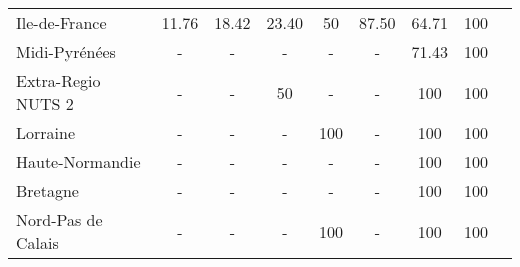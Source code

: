 \begin{table}[H]
\begin{tabularx}{\textwidth}{Xcccccccc}
            Ile-de-France & 11.76 & 18.42 & 23.40 & 50 & 87.50 & 64.71 & 100 \\
            Midi-Pyrénées & - & - & - & - & - & 71.43 & 100 \\
            Extra-Regio NUTS 2 & - & - & 50 & - & - & 100 & 100 \\
            Lorraine & - & - & - & 100 & - & 100 & 100 \\
            Haute-Normandie  & - & - & - & - & - & 100 & 100 \\
            Bretagne & - & - & - & - & - & 100 & 100 \\
            Nord-Pas de Calais & - & - & - & 100 & - & 100 & 100 \\
        \bottomrule
    \end{tabularx}
\end{table}
    
